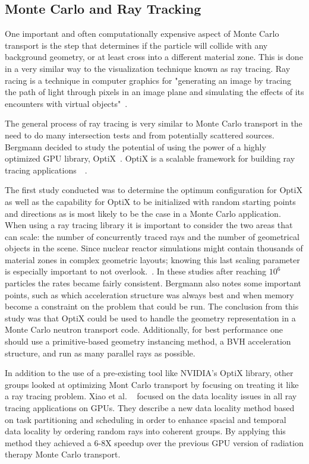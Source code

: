 \subsection{Monte Carlo and Ray Tracking}

One important and often computationally expensive aspect of Monte Carlo transport is the step that determines if the particle will collide with any background geometry, or at least cross into a different material zone.
%
This is done in a very similar way to the visualization technique known as ray tracing.
%
Ray racing is a technique in computer graphics for "generating an image by tracing the path of light through pixels in an image plane and simulating the effects of its encounters with virtual objects"~\cite{wikipediaRayTracing}.

The general process of ray tracing is very similar to Monte Carlo transport in the need to do many intersection tests and from potentially scattered sources.
%
Bergmann decided to study the potential of using the power of a highly optimized GPU library, OptiX~\cite{bergmann2014development}.
%
OptiX is a scalable framework for building ray tracing applications~\cite{optixProgrammingGuide}~\cite{parker2010optix}.

%
The first study conducted was to determine the optimum configuration for OptiX as well as the capability for OptiX to be initialized with random starting points and directions as is most likely to be the case in a Monte Carlo application.
%
When using a ray tracing library it is important to consider the two areas that can scale: the number of concurrently traced rays and the number of geometrical objects in the scene.
%
Since nuclear reactor simulations might contain thousands of material zones in complex geometric layouts; knowing this last scaling parameter is especially important to not overlook.~\cite{bergmann2014development}.
%
 In these studies after reaching $10^6$ particles the rates became fairly consistent.
 Bergmann also notes some important points, such as which acceleration structure was always best and when memory become a constraint on the problem that could be run.
 The conclusion from this study was that OptiX could be used to handle the geometry representation in a Monte Carlo neutron transport code.
 Additionally, for best performance one should use a primitive-based geometry instancing method, a BVH acceleration structure, and run as many parallel rays as possible.
%

%
In addition to the use of a pre-existing tool like NVIDIA's OptiX library, other groups looked at optimizing Mont Carlo transport by focusing on treating it like a ray tracing problem.
%
Xiao et al. ~\cite{xiao2015monte} focused on the data locality issues in all ray tracing applications on GPUs.
%
They describe a new data locality method based on task partitioning and scheduling in order to enhance spacial and temporal data locality by ordering random rays into coherent groups.
%
By applying this method they achieved a 6-8X speedup over the previous GPU version of radiation therapy Monte Carlo transport. 
%

